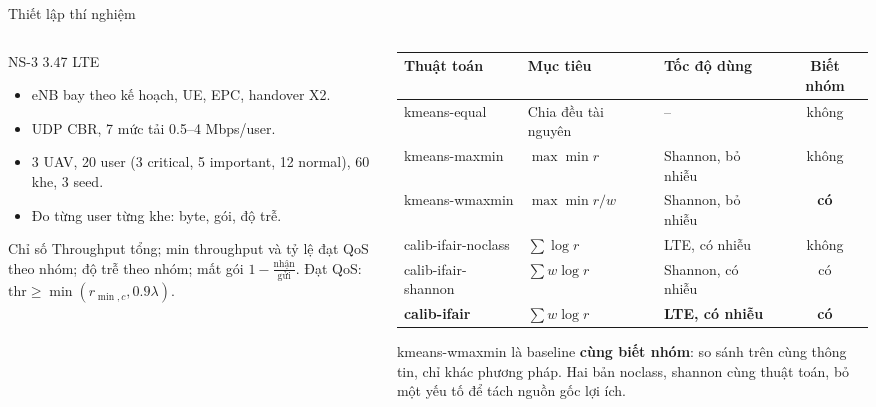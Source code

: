 \documentclass[aspectratio=169,10pt,t]{beamer}
\newcommand{\hl}[1]{\textcolor{MainBlue}{\textbf{#1}}}
\begin{document}
\begin{frame}{Thiết lập thí nghiệm}
\begin{columns}[T,onlytextwidth]
\begin{column}{0.36\textwidth}
\vspace{0pt}
  \begin{block}{NS-3 3.47 LTE}
    \scriptsize
    \begin{itemize}
      \item eNB bay theo kế hoạch, UE, EPC, handover X2.
      \item UDP CBR, 7 mức tải 0.5--4 Mbps/user.
      \item 3 UAV, 20 user (3 critical, 5 important, 12 normal), 60 khe, 3 seed.
      \item Đo từng user từng khe: byte, gói, độ trễ.
    \end{itemize}
  \end{block}
  \begin{block}{Chỉ số}
    \scriptsize
    Throughput tổng; min throughput và tỷ lệ đạt QoS theo nhóm; độ trễ theo nhóm; mất gói $1 - \frac{\text{nhận}}{\text{gửi}}$.
    Đạt QoS: $\mathrm{thr} \ge \min(r_{\min,c}, 0.9\lambda)$.
  \end{block}
\end{column}
\begin{column}{0.60\textwidth}
\vspace{0pt}
  \scriptsize
  \begin{tabularx}{\linewidth}{@{}lXlc@{}}
    \toprule
    \textbf{Thuật toán} & \textbf{Mục tiêu} & \textbf{Tốc độ dùng} & \textbf{Biết nhóm}\\
    \midrule
    kmeans-equal & Chia đều tài nguyên & -- & không\\
    kmeans-maxmin & $\max\min r$ & Shannon, bỏ nhiễu & không\\
    kmeans-wmaxmin & $\max\min r/w$ & Shannon, bỏ nhiễu & \textbf{có}\\
    calib-ifair-noclass & $\sum\log r$ & LTE, có nhiễu & không\\
    calib-ifair-shannon & $\sum w\log r$ & Shannon, có nhiễu & có\\
    \hl{calib-ifair} & \hl{$\sum w\log r$} & \hl{LTE, có nhiễu} & \hl{có}\\
    \bottomrule
  \end{tabularx}

  \vspace{2mm}
  kmeans-wmaxmin là baseline \hl{cùng biết nhóm}: so sánh trên cùng thông tin, chỉ khác phương pháp.
  Hai bản noclass, shannon cùng thuật toán, bỏ một yếu tố để tách nguồn gốc lợi ích.
\end{column}
\end{columns}
\end{frame}
\end{document}
